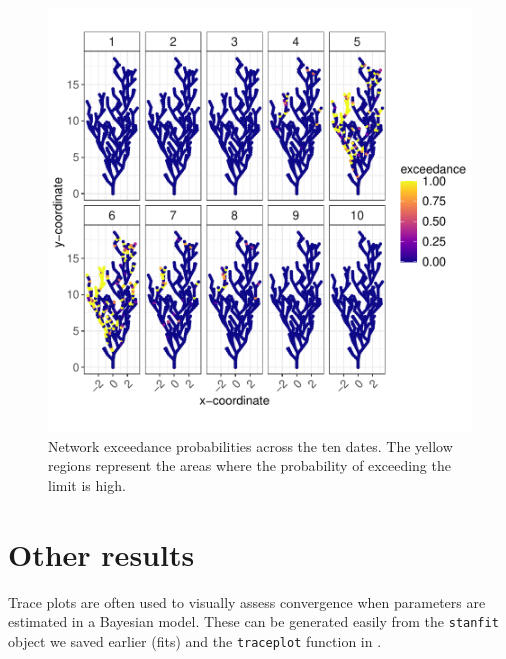 \begin{figure}[htbp]
  \centering
   \includegraphics[width=6.0in]{./Figs/7network_exc_prob.pdf}
  \caption{
  Network exceedance probabilities across the ten dates. The yellow regions represent the areas where the probability of exceeding the limit is high.
  }
  \label{figure:7network_exc_prob}
\end{figure}


\clearpage
\section*{Other results} 
\label{sec:others}


Trace plots are often used to visually assess convergence when parameters are estimated in a Bayesian model. These can be generated easily from the \texttt{stanfit} object we saved earlier (fits) and the \texttt{traceplot} function in  .

